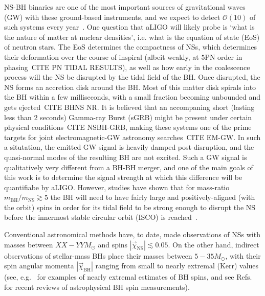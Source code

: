 \documentclass[aps,prd,amsmath,floats,floatfix, twocolumn,
superscriptaddress,nofootinbib,showpacs]{revtex4-1}
\newcommand{\prayush}{\textcolor{red!40!black}}
\newcommand{\mbh}{m_\mathrm{BH}}
\newcommand{\mns}{m_\mathrm{NS}}
\begin{document}
NS-BH binaries are one of the most important sources of gravitational waves (GW)
with these ground-based instruments, and we expect to detect $\mathcal{O}(10)$
of such systems every year~\cite{Abadie:2010cf}. 
%
One question that aLIGO will likely probe is `what is the nature of
matter at nuclear densities', i.e. what is the equation of state (EoS) of 
neutron stars. The EoS determines the compactness of NSs, which determines
their deformation over the course of inspiral (albeit weakly, at $5$PN order in 
phasing~\prayush{CITE PN TIDAL RESULTS}), as well as how early in the coalescence
process will the NS be disrupted by the tidal field of the BH. Once disrupted,
the NS forms an accretion disk around the BH. Most of this matter disk spirals 
into the BH within a few milliseconds, with a small fraction becoming unbounded
and gets ejected~\prayush{CITE BHNS NR}. It is believed that an accompaning
short (lasting less than $2$ seconds) Gamma-ray Burst (sGRB) might be present
under certain physical conditions~\prayush{CITE NSBH-GRB},
making these systems one of the prime targets for joint electromagnetic-GW
astronomy searches~\prayush{CITE EM-GW}.
In such a situtation, the emitted GW signal
is heavily damped post-disruption, and the quasi-normal modes of the resulting
BH are not excited. Such a GW signal is qualitatively very different from a
BH-BH merger, and one of the main goals of this work is to determine the 
signal strength at which this difference will be quantifiabe by aLIGO.
%
However, studies have shown that for mass-ratio $\mbh/\mns\gtrsim 5$ the BH
will need to have fairly large and positively-aligned (with the orbit) spins
in order for its tidal field to be strong enough to disrupt the NS before the
innermost stable circular orbit (ISCO) is reached~\cite{Foucart:2013psa}.


Conventional astronomical 
methods have, to date, made observations of NSs with masses between 
$XX-YY M_\odot$ and spins $|\vec{\chi}_\mathrm{NS}|\lesssim 0.05$. On the other hand, 
indirect observations of stellar-mass BHs place their masses between 
$5-35M_\odot$, with their spin angular momenta $|\vec{\chi}_\mathrm{BH}|$ 
ranging from small to nearly extremal (Kerr) values (see,
e.g.~\cite{McClintockEtAl:2006,Miller:2009cw,Gou:2014una} for examples of 
nearly extremal estimates of BH spins, and see
Refs.~\cite{McClintock:2013vwa,Reynolds:2013qqa} for recent reviews of
astrophysical BH spin measurements). 
\end{document}
